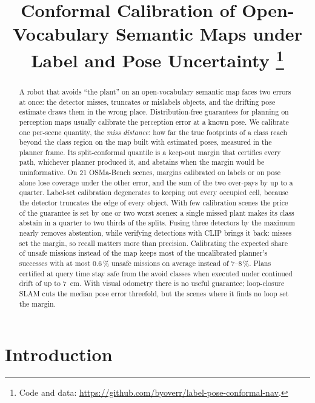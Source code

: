 \documentclass[conference]{IEEEtran}
\theoremstyle{definition}
\begin{document}
\title{Conformal Calibration of Open-Vocabulary Semantic Maps under Label and Pose Uncertainty%
\thanks{Code and data: \url{https://github.com/byoverr/label-pose-conformal-nav}.}}

\author{
}

\maketitle

\begin{abstract}
A robot that avoids ``the plant'' on an open-vocabulary semantic map faces two errors at once: the detector misses,
truncates or mislabels objects, and the drifting pose estimate draws them in the wrong place. Distribution-free
guarantees for planning on perception maps usually calibrate the perception error at a known pose. We calibrate one
per-scene quantity, the \emph{miss distance}: how far the true footprints of a class reach beyond the class region on
the map built with estimated poses, measured in the planner frame. Its split-conformal quantile is a keep-out margin
that certifies every path, whichever planner produced it, and abstains when the margin would be uninformative. On 21
OSMa-Bench scenes, margins calibrated on labels or on pose alone lose coverage under the other error, and the sum of
the two over-pays by up to a quarter. Label-set calibration degenerates to keeping out every occupied cell, because the
detector truncates the edge of every object. With few calibration scenes the price of the guarantee is set by one or two worst scenes: a single
missed plant makes its class abstain in a quarter to two thirds of the splits. Fusing three detectors by the maximum
nearly removes abstention, while verifying detections with CLIP brings it back: misses set the margin, so recall
matters more than precision. Calibrating the expected share of unsafe missions instead of the map keeps most of the
uncalibrated planner's successes with at most 0.6\,\% unsafe missions on average instead of 7--8\,\%. Plans certified at query time stay safe from the avoid classes
when executed under continued drift of up to 7~cm. With visual odometry there is no useful guarantee; loop-closure SLAM cuts
the median pose error threefold, but the scenes where it finds no loop set the margin.
\end{abstract}

\section{Introduction}
\end{document}
